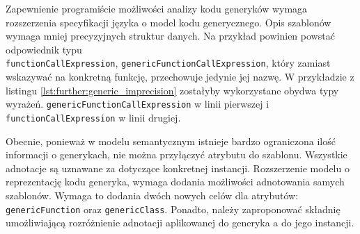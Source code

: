 Zapewnienie programiście możliwości analizy kodu generyków wymaga rozszerzenia specyfikacji języka o model kodu generycznego.
Opis szablonów wymaga mniej precyzyjnych struktur danych.
Na przykład powinien powstać odpowiednik typu \\\lstinline{functionCallExpression}, \lstinline{genericFunctionCallExpression}, który zamiast wskazywać na konkretną funkcję, przechowuje jedynie jej nazwę.
W przykładzie z listingu \ref{lst:further:generic_imprecision} zostałyby wykorzystane obydwa typy wyrażeń.
\lstinline{genericFunctionCallExpression} w linii pierwszej i \lstinline{functionCallExpression} w linii drugiej.

Obecnie, ponieważ w modelu semantycznym istnieje bardzo ograniczona ilość informacji o generykach, nie można przyłączyć atrybutu do szablonu.
Wszystkie adnotacje są uznawane za dotyczące konkretnej instancji.
Rozszerzenie modelu o reprezentację kodu generyka, wymaga dodania możliwości adnotowania samych szablonów.
Wymaga to dodania dwóch nowych celów dla atrybutów: \lstinline{genericFunction} oraz \lstinline{genericClass}.
Ponadto, należy zaproponować składnię umożliwiającą rozróżnienie adnotacji aplikowanej do generyka a do jego instancji.
